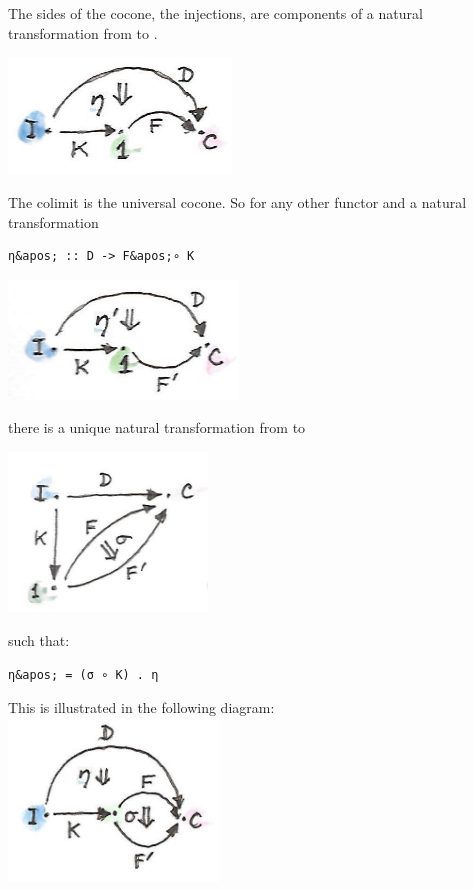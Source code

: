 The sides of the cocone, the injections, are components of a natural
transformation  from  to .

\includegraphics[width=2.33333in]{images/kan10a.jpg}

The colimit is the universal cocone. So for any other functor
 and a natural transformation

\begin{verbatim}
η&apos; :: D -> F&apos;∘ K
\end{verbatim}

\includegraphics[width=2.40625in]{images/kan10b.jpg}

there is a unique natural transformation  from  to

\includegraphics[width=2.08333in]{images/kan14.jpg}

such that:

\begin{verbatim}
η&apos; = (σ ∘ K) . η
\end{verbatim}

This is illustrated in the following diagram:\\
\includegraphics[width=2.19792in]{images/kan112.jpg}

